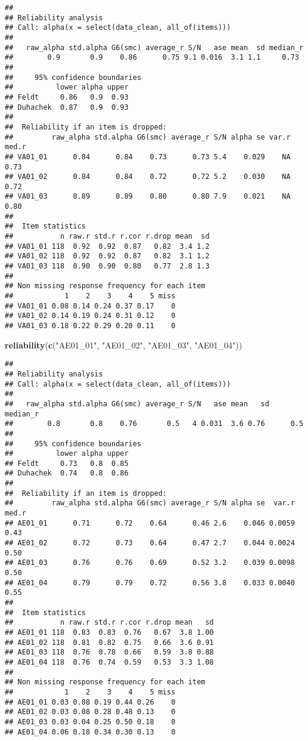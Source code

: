 \documentclass[
]{article}
\newenvironment{Shaded}{\begin{snugshade}}{\end{snugshade}}
\newcommand{\FunctionTok}[1]{\textcolor[rgb]{0.13,0.29,0.53}{\textbf{#1}}}
\newcommand{\NormalTok}[1]{#1}
\newcommand{\StringTok}[1]{\textcolor[rgb]{0.31,0.60,0.02}{#1}}
\begin{document}
\begin{verbatim}
## 
## Reliability analysis   
## Call: alpha(x = select(data_clean, all_of(items)))
## 
##   raw_alpha std.alpha G6(smc) average_r S/N   ase mean  sd median_r
##        0.9       0.9    0.86      0.75 9.1 0.016  3.1 1.1     0.73
## 
##     95% confidence boundaries 
##          lower alpha upper
## Feldt     0.86   0.9  0.93
## Duhachek  0.87   0.9  0.93
## 
##  Reliability if an item is dropped:
##         raw_alpha std.alpha G6(smc) average_r S/N alpha se var.r med.r
## VA01_01      0.84      0.84    0.73      0.73 5.4    0.029    NA  0.73
## VA01_02      0.84      0.84    0.72      0.72 5.2    0.030    NA  0.72
## VA01_03      0.89      0.89    0.80      0.80 7.9    0.021    NA  0.80
## 
##  Item statistics 
##           n raw.r std.r r.cor r.drop mean  sd
## VA01_01 118  0.92  0.92  0.87   0.82  3.4 1.2
## VA01_02 118  0.92  0.92  0.87   0.82  3.1 1.2
## VA01_03 118  0.90  0.90  0.80   0.77  2.8 1.3
## 
## Non missing response frequency for each item
##            1    2    3    4    5 miss
## VA01_01 0.08 0.14 0.24 0.37 0.17    0
## VA01_02 0.14 0.19 0.24 0.31 0.12    0
## VA01_03 0.18 0.22 0.29 0.20 0.11    0
\end{verbatim}

\begin{Shaded}
\begin{Highlighting}[]
\FunctionTok{reliability}\NormalTok{(}\FunctionTok{c}\NormalTok{(}\StringTok{"AE01\_01"}\NormalTok{, }\StringTok{"AE01\_02"}\NormalTok{, }\StringTok{"AE01\_03"}\NormalTok{, }\StringTok{"AE01\_04"}\NormalTok{))}
\end{Highlighting}
\end{Shaded}

\begin{verbatim}
## 
## Reliability analysis   
## Call: alpha(x = select(data_clean, all_of(items)))
## 
##   raw_alpha std.alpha G6(smc) average_r S/N   ase mean   sd median_r
##        0.8       0.8    0.76       0.5   4 0.031  3.6 0.76      0.5
## 
##     95% confidence boundaries 
##          lower alpha upper
## Feldt     0.73   0.8  0.85
## Duhachek  0.74   0.8  0.86
## 
##  Reliability if an item is dropped:
##         raw_alpha std.alpha G6(smc) average_r S/N alpha se  var.r med.r
## AE01_01      0.71      0.72    0.64      0.46 2.6    0.046 0.0059  0.43
## AE01_02      0.72      0.73    0.64      0.47 2.7    0.044 0.0024  0.50
## AE01_03      0.76      0.76    0.69      0.52 3.2    0.039 0.0098  0.50
## AE01_04      0.79      0.79    0.72      0.56 3.8    0.033 0.0040  0.55
## 
##  Item statistics 
##           n raw.r std.r r.cor r.drop mean   sd
## AE01_01 118  0.83  0.83  0.76   0.67  3.8 1.00
## AE01_02 118  0.81  0.82  0.75   0.66  3.6 0.91
## AE01_03 118  0.76  0.78  0.66   0.59  3.8 0.88
## AE01_04 118  0.76  0.74  0.59   0.53  3.3 1.08
## 
## Non missing response frequency for each item
##            1    2    3    4    5 miss
## AE01_01 0.03 0.08 0.19 0.44 0.26    0
## AE01_02 0.03 0.08 0.28 0.48 0.13    0
## AE01_03 0.03 0.04 0.25 0.50 0.18    0
## AE01_04 0.06 0.18 0.34 0.30 0.13    0
\end{verbatim}
\end{document}
